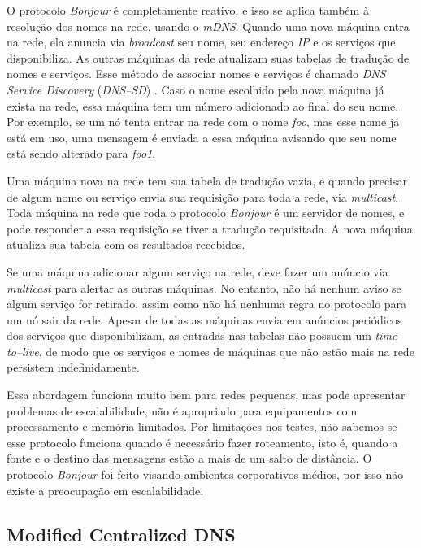     O protocolo \textit{Bonjour} é completamente reativo, e isso se aplica também à resolução dos nomes na rede, usando o \textit{mDNS}. Quando uma nova máquina entra na rede, ela anuncia via \textit{broadcast} seu nome, seu endereço \emph{IP} e os serviços que disponibiliza. As outras máquinas da rede atualizam suas tabelas de tradução de nomes e serviços. Esse método de associar nomes e serviços é chamado \textit{DNS Service Discovery} (\textit{DNS--SD}) \cite{dnssd}. Caso o nome escolhido pela nova máquina já exista na rede, essa máquina tem um número adicionado ao final do seu nome. Por exemplo, se um nó tenta entrar na rede com o nome \emph{foo}, mas esse nome já está em uso, uma mensagem é enviada a essa máquina avisando que seu nome está sendo alterado para \emph{foo1}.
    
    Uma máquina nova na rede tem sua tabela de tradução vazia, e quando precisar de algum nome ou serviço envia sua requisição para toda a rede, via \textit{multicast}. Toda máquina na rede que roda o protocolo \textit{Bonjour} é um servidor de nomes, e pode responder a essa requisição se tiver a tradução requisitada. A nova máquina atualiza sua tabela com os resultados recebidos.
    
    Se uma máquina adicionar algum serviço na rede, deve fazer um anúncio via \textit{multicast} para alertar as outras máquinas. No entanto, não há nenhum aviso se algum serviço for retirado, assim como não há nenhuma regra no protocolo para um nó sair da rede. Apesar de todas as máquinas enviarem anúncios periódicos dos serviços que disponibilizam, as entradas nas tabelas não possuem um \textit{time--to--live}, de modo que os serviços e nomes de máquinas que não estão mais na rede persistem indefinidamente.
    
    Essa abordagem funciona muito bem para redes pequenas, mas pode apresentar problemas de escalabilidade, não é apropriado para equipamentos com processamento e memória limitados. Por limitações nos testes, não sabemos se esse protocolo funciona quando é necessário fazer roteamento, isto é, quando a fonte e o destino das mensagens estão a mais de um salto de distância. O protocolo \textit{Bonjour} foi feito visando ambientes corporativos médios, por isso não existe a preocupação em escalabilidade.


\subsection{Modified Centralized DNS}

